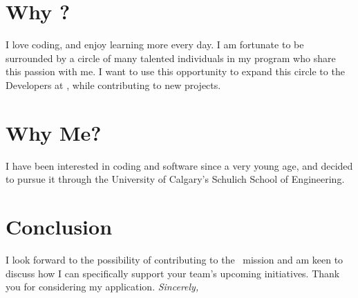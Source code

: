 \section{Why \companyName?}
I love coding, and enjoy learning more every day. I am fortunate to be surrounded by a circle of many talented individuals in my program who share this passion with me. I want to use this opportunity to expand this circle to the Developers at \companyName, while contributing to new projects.

\section{Why Me?}
I have been interested in coding and software since a very young age, and decided to pursue it through the University of Calgary’s Schulich School of Engineering. \whyMePersonalized{}
\section{Conclusion}

I look forward to the possibility of contributing to the \companyName~mission and am keen to discuss how I can specifically support your team's upcoming initiatives. Thank you for considering my application.
\newline
\newline
\Large{
	\textit{Sincerely,}\\
	\userFullName
}

